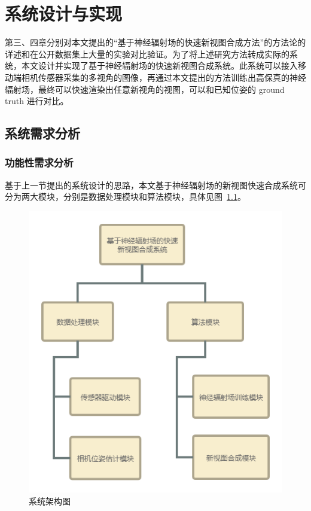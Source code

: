 
\chapter{系统设计与实现}\label{figures_tables}
第三、四章分别对本文提出的“基于神经辐射场的快速新视图合成方法”的方法论的详述和在公开数据集上大量的实验对比验证。为了将上述研究方法转成实际的系统，本文设计并实现了基于神经辐射场的快速新视图合成系统。此系统可以接入移动端相机传感器采集的多视角的图像，再通过本文提出的方法训练出高保真的神经辐射场，最终可以快速渲染出任意新视角的视图，可以和已知位姿的 ground truth 进行对比。

\section{系统需求分析}

\subsection{功能性需求分析}
基于上一节提出的系统设计的思路，本文基于神经辐射场的新视图快速合成系统可分为两大模块，分别是数据处理模块和算法模块，具体见图~\ref{fig:system_struct}。
\begin{figure}[htbp]
    \centering
    \includegraphics[width=0.65\linewidth]{figures/system_struct.png}
    \caption{系统架构图}
    \label{fig:system_struct}
\end{figure}

